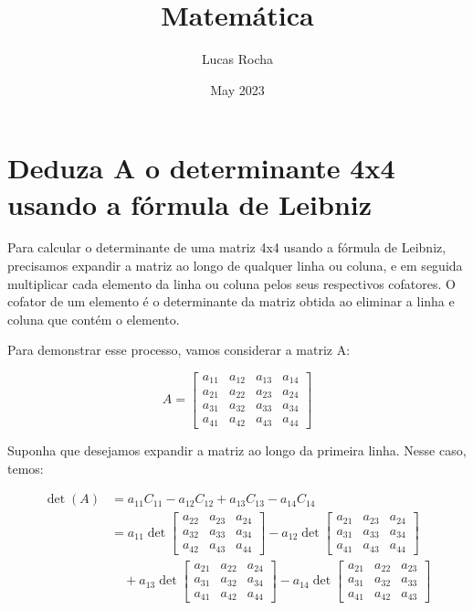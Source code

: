 \documentclass{article}
\title{Matemática}
\author{Lucas Rocha }
\date{May 2023}
\begin{document}
\maketitle
\section{Deduza A o determinante 4x4 usando a fórmula de Leibniz}
Para calcular o determinante de uma matriz 4x4 usando a fórmula de Leibniz, precisamos expandir a matriz ao longo de qualquer linha ou coluna, e em seguida multiplicar cada elemento da linha ou coluna pelos seus respectivos cofatores. O cofator de um elemento é o determinante da matriz obtida ao eliminar a linha e coluna que contém o elemento.

Para demonstrar esse processo, vamos considerar a matriz A:

$$
A = \begin{bmatrix}
a_{11} & a_{12} & a_{13} & a_{14} \\
a_{21} & a_{22} & a_{23} & a_{24} \\
a_{31} & a_{32} & a_{33} & a_{34} \\
a_{41} & a_{42} & a_{43} & a_{44}
\end{bmatrix}
$$

Suponha que desejamos expandir a matriz ao longo da primeira linha. Nesse caso, temos:

$$
\begin{aligned}
\det(A) &= a_{11}C_{11} - a_{12}C_{12} + a_{13}C_{13} - a_{14}C_{14} \\
&= a_{11}\det\begin{bmatrix}
a_{22} & a_{23} & a_{24} \\
a_{32} & a_{33} & a_{34} \\
a_{42} & a_{43} & a_{44}
\end{bmatrix}
- a_{12}\det\begin{bmatrix}
a_{21} & a_{23} & a_{24} \\
a_{31} & a_{33} & a_{34} \\
a_{41} & a_{43} & a_{44}
\end{bmatrix} \\
&\quad + a_{13}\det\begin{bmatrix}
a_{21} & a_{22} & a_{24} \\
a_{31} & a_{32} & a_{34} \\
a_{41} & a_{42} & a_{44}
\end{bmatrix}
- a_{14}\det\begin{bmatrix}
a_{21} & a_{22} & a_{23} \\
a_{31} & a_{32} & a_{33} \\
a_{41} & a_{42} & a_{43}
\end{bmatrix}
\end{aligned}
$$
\end{document}
